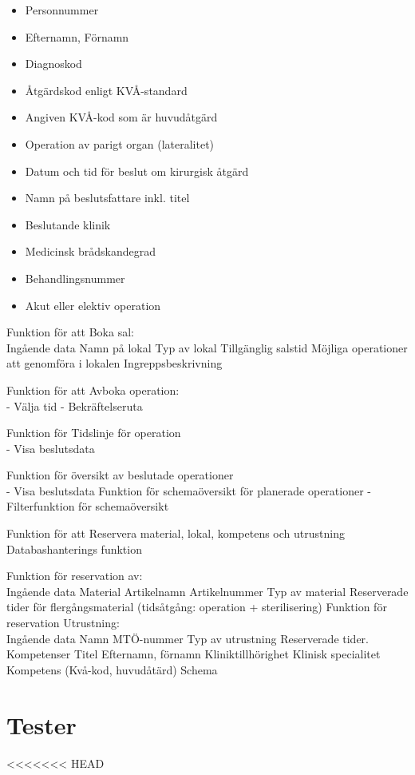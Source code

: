 \documentclass[a4paper,10pt]{article}
\begin{document}
\begin{itemize}
	\item Personnummer
	\item Efternamn, Förnamn
	\item Diagnoskod
	\item Åtgärdskod enligt KVÅ-standard
	\item Angiven KVÅ-kod som är huvudåtgärd
	\item Operation av parigt organ (lateralitet)
	\item Datum och tid för beslut om kirurgisk åtgärd
	\item Namn på beslutsfattare inkl. titel
	\item Beslutande klinik
	\item Medicinsk brådskandegrad
	\item Behandlingsnummer
	\item Akut eller elektiv operation

\end{itemize}


Funktion för att Boka sal: \\
Ingående data
Namn på lokal
Typ av lokal
Tillgänglig salstid
Möjliga operationer att genomföra i lokalen
Ingreppsbeskrivning

Funktion för att Avboka operation: \\
-	Välja tid
-	Bekräftelseruta

Funktion för Tidslinje för operation \\
-	Visa beslutsdata

Funktion för översikt av beslutade operationer \\
-	Visa beslutsdata
Funktion för schemaöversikt för planerade operationer
-	Filterfunktion för schemaöversikt

Funktion för att Reservera material, lokal, kompetens och utrustning \\
Databashanterings funktion

Funktion för reservation av: \\
Ingående data
	Material
	Artikelnamn
	Artikelnummer
	Typ av material
	Reserverade tider för flergångsmaterial (tidsåtgång: operation + sterilisering)
Funktion för reservation Utrustning: \\
Ingående data
	Namn
	MTÖ-nummer
	Typ av utrustning
	Reserverade tider.
Kompetenser
Titel
Efternamn, förnamn
Kliniktillhörighet
Klinisk specialitet
Kompetens (Kvå-kod, huvudåtärd)
Schema


\section{Tester}
<<<<<<< HEAD
\end{document}
